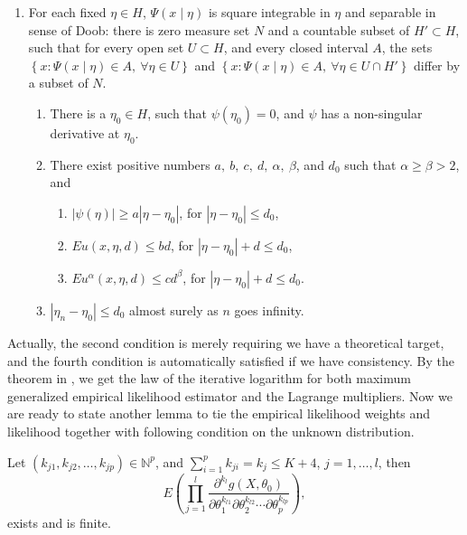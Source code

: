 \begin{enumerate}
\item For each fixed $\eta\in H$, $\Psi\left(x\mid\eta\right)$ is square
integrable in $\eta$ and separable in sense of Doob: there is zero
measure set $N$ and a countable subset of $H'\subset H$, such that
for every open set $U\subset H$, and every closed interval $A$,
the sets $\left\{ x:\Psi\left(x\mid\eta\right)\in A,\:\forall\eta\in U\right\} $
and $\left\{ x:\Psi\left(x\mid\eta\right)\in A,\:\forall\eta\in U\cap H'\right\} $
differ by a subset of $N$.

\begin{enumerate}
\item There is a $\eta_{0}\in H$, such that $\psi\left(\eta_{0}\right)=0$,
and $\psi$ has a non-singular derivative at $\eta_{0}$.
\item There exist positive numbers $a,\: b,\: c,\: d,\:\alpha,\:\beta$,
and $d_{0}$ such that $\alpha\ge\beta>2$, and 

\begin{enumerate}
\item $\left|\psi\left(\eta\right)\right|\ge a\left|\eta-\eta_{0}\right|$,
for $\left|\eta-\eta_{0}\right|\le d_{0}$,
\item $Eu\left(x,\eta,d\right)\le bd$, for $\left|\eta-\eta_{0}\right|+d\le d_{0}$,
\item $Eu^{\alpha}\left(x,\eta,d\right)\le cd^{\beta}$, for $\left|\eta-\eta_{0}\right|+d\le d_{0}$.
\end{enumerate}
\item $\left|\eta_{n}-\eta_{0}\right|\le d_{0}$ almost surely as $n$ goes
infinity.
\end{enumerate}
\end{enumerate}
Actually, the second condition is merely requiring we have a theoretical
target, and the fourth condition is automatically satisfied if we
have consistency. By the theorem in \citet{he1995law},
we get the law of the iterative logarithm for both maximum generalized
empirical likelihood estimator and the Lagrange multipliers. Now we
are ready to state another lemma to tie the empirical likelihood weights
and likelihood together with following condition on the unknown distribution.
\begin{assumption}
\label{assu:finite-theoretic-moment} Let $\left(k_{j1},k_{j2},\ldots,k_{jp}\right)\in\mathbb{N}^{p}$,
and $\sum_{i=1}^{p}k_{ji}=k_{j}\le K+4$, $j=1,\ldots,l$, then 
\[
E\left(\prod_{j=1}^{l}\frac{\partial^{k_{l}}g\left(X,\theta_{0}\right)}{\partial\theta_{1}^{k_{l1}}\partial\theta_{2}^{k_{l2}}\cdots\partial\theta_{p}^{k_{lp}}}\right),
\]
exists and is finite.\end{assumption}
